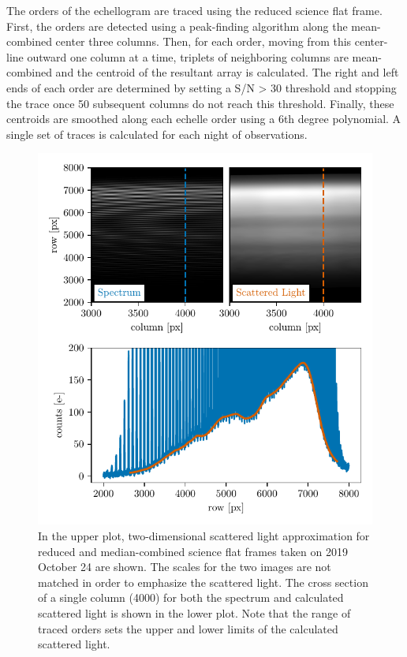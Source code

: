 The orders of the echellogram are traced using the reduced science flat frame. First, the orders are detected using a peak-finding algorithm along the mean-combined center three columns. Then, for each order, moving from this center-line outward one column at a time, triplets of neighboring columns are mean-combined and the centroid of the resultant array is calculated. The right and left ends of each order are determined by setting a S/N > 30 threshold and stopping the trace once 50 subsequent columns do not reach this threshold. Finally, these centroids are smoothed along each echelle order using a 6th degree polynomial. A single set of traces is calculated for each night of observations.

\begin{figure}
    \centering
    \includegraphics[width=\textwidth]{figures-4/scat_light.pdf}
    \caption[EXPRES scattered light approximation]{In the upper plot, two-dimensional scattered light approximation for reduced and median-combined science flat frames taken on 2019 October 24 are shown. The scales for the two images are not matched in order to emphasize the scattered light. The cross section of a single column (4000) for both the spectrum and calculated scattered light is shown in the lower plot. Note that the range of traced orders sets the upper and lower limits of the calculated scattered light.}
    \label{fig:scattered_light}
\end{figure}

